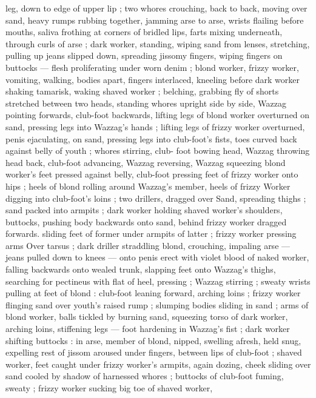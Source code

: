 leg, down to edge of upper lip ; two whores crouching, back to back, 
moving over sand, heavy rumps rubbing together, jamming arse to 
arse, wrists flailing before mouths, saliva frothing at corners of 
bridled lips, farts mixing underneath, through curls of arse ; dark 
worker, standing, wiping sand from lenses, stretching, pulling up 
jeans slipped down, spreading jissomy fingers, wiping fingers on 
buttocks --- flesh proliferating under worn denim ; blond worker, 
frizzy worker, vomiting, walking, bodies apart, fingers interlaced, 
kneeling before dark worker shaking tamarisk, waking shaved worker 
; belching, grabbing fly of shorts stretched between two heads, 
standing whores upright side by side, Wazzag pointing forwards, 
club-foot backwards, lifting legs of blond worker overturned on 
sand, pressing legs into Wazzag's hands ; lifting legs of frizzy worker 
overturned, penis ejaculating, on sand, pressing legs into club-foot's 
fists, toes curved back against belly of youth ; whores stirring, club- 
foot bowing head, Wazzag throwing head back, club-foot advancing, 
Wazzag reversing, Wazzag squeezing blond worker's feet pressed 
against belly, club-foot pressing feet of frizzy worker onto hips ; 
heels of blond rolling around Wazzag's member, heels of frizzy 
Worker digging into club-foot's loins ; two drillers, dragged over 
Sand, spreading thighs ; sand packed into armpits ; dark worker 
holding shaved worker's shoulders, buttocks, pushing body 
backwards onto sand, behind frizzy worker dragged forwards. sliding 
feet of former under armpits of latter ; frizzy worker pressing arms 
Over tarsus ; dark driller straddling blond, crouching, impaling arse 
--- jeans pulled down to knees --- onto penis erect with violet blood 
of naked worker, falling backwards onto wealed trunk, slapping feet 
onto Wazzag's thighs, searching for pectineus with flat of heel, 
pressing ; Wazzag stirring ; sweaty wrists pulling at feet of blond : 
club-foot leaning forward, arching loins ; frizzy worker flinging sand 
over youth's raised rump ; slumping bodies sliding in sand ; arms of 
blond worker, balls tickled by burning sand, squeezing torso of dark 
worker, arching loins, stiffening legs --- foot hardening in Wazzag's 
fist ; dark worker shifting buttocks : in arse, member of blond, 
nipped, swelling afresh, held snug, expelling rest of jissom aroused 
under fingers, between lips of club-foot ; shaved worker, feet caught 
under frizzy worker's armpits, again dozing, cheek sliding over sand 
cooled by shadow of harnessed whores ; buttocks of club-foot 
fuming, sweaty ; frizzy worker sucking big toe of shaved worker, 

